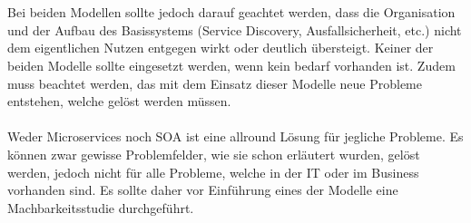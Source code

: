 \\\\
Bei beiden Modellen sollte jedoch darauf geachtet werden, dass die Organisation und der Aufbau des Basissystems (Service Discovery, Ausfallsicherheit, etc.) nicht dem eigentlichen Nutzen entgegen wirkt oder deutlich übersteigt. Keiner der beiden Modelle sollte eingesetzt werden, wenn kein bedarf vorhanden ist. Zudem muss beachtet werden, das mit dem Einsatz dieser Modelle neue Probleme entstehen, welche gelöst werden müssen.
\\\\
Weder Microservices noch SOA ist eine allround Lösung für jegliche Probleme. Es können zwar gewisse Problemfelder, wie sie schon erläutert wurden, gelöst werden, jedoch nicht für alle Probleme, welche in der IT oder im Business vorhanden sind. Es sollte daher vor Einführung eines der Modelle eine Machbarkeitsstudie durchgeführt.